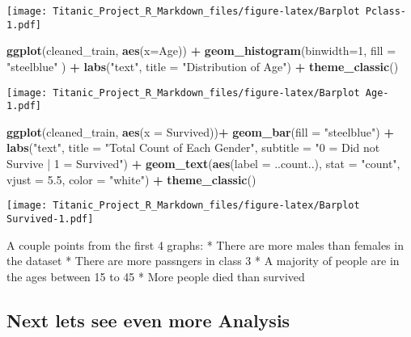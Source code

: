 \documentclass[
]{article}
\newenvironment{Shaded}{\begin{snugshade}}{\end{snugshade}}
\newcommand{\AttributeTok}[1]{\textcolor[rgb]{0.13,0.29,0.53}{#1}}
\newcommand{\DecValTok}[1]{\textcolor[rgb]{0.00,0.00,0.81}{#1}}
\newcommand{\FloatTok}[1]{\textcolor[rgb]{0.00,0.00,0.81}{#1}}
\newcommand{\FunctionTok}[1]{\textcolor[rgb]{0.13,0.29,0.53}{\textbf{#1}}}
\newcommand{\NormalTok}[1]{#1}
\newcommand{\SpecialCharTok}[1]{\textcolor[rgb]{0.81,0.36,0.00}{\textbf{#1}}}
\newcommand{\StringTok}[1]{\textcolor[rgb]{0.31,0.60,0.02}{#1}}
\begin{document}
\texttt{[image: Titanic\_Project\_R\_Markdown\_files/figure-latex/Barplot Pclass-1.pdf]}

\begin{Shaded}
\begin{Highlighting}[]
\FunctionTok{ggplot}\NormalTok{(cleaned\_train, }\FunctionTok{aes}\NormalTok{(}\AttributeTok{x=}\NormalTok{Age)) }\SpecialCharTok{+} 
  \FunctionTok{geom\_histogram}\NormalTok{(}\AttributeTok{binwidth=}\DecValTok{1}\NormalTok{, }\AttributeTok{fill =} \StringTok{"steelblue"}\NormalTok{ ) }\SpecialCharTok{+} 
  \FunctionTok{labs}\NormalTok{(}\StringTok{"text"}\NormalTok{, }\AttributeTok{title =} \StringTok{"Distribution of Age"}\NormalTok{) }\SpecialCharTok{+}
  \FunctionTok{theme\_classic}\NormalTok{()}
\end{Highlighting}
\end{Shaded}

\texttt{[image: Titanic\_Project\_R\_Markdown\_files/figure-latex/Barplot Age-1.pdf]}

\begin{Shaded}
\begin{Highlighting}[]
\FunctionTok{ggplot}\NormalTok{(cleaned\_train, }\FunctionTok{aes}\NormalTok{(}\AttributeTok{x =}\NormalTok{ Survived))}\SpecialCharTok{+} 
  \FunctionTok{geom\_bar}\NormalTok{(}\AttributeTok{fill =} \StringTok{"steelblue"}\NormalTok{) }\SpecialCharTok{+} 
  \FunctionTok{labs}\NormalTok{(}\StringTok{"text"}\NormalTok{, }\AttributeTok{title =} \StringTok{"Total Count of Each Gender"}\NormalTok{, }\AttributeTok{subtitle =} \StringTok{"0 = Did not Survive | 1 = Survived"}\NormalTok{) }\SpecialCharTok{+}
  \FunctionTok{geom\_text}\NormalTok{(}\FunctionTok{aes}\NormalTok{(}\AttributeTok{label =}\NormalTok{ ..count..), }\AttributeTok{stat =} \StringTok{"count"}\NormalTok{, }\AttributeTok{vjust =} \FloatTok{5.5}\NormalTok{, }\AttributeTok{color =} \StringTok{"white"}\NormalTok{) }\SpecialCharTok{+}
  \FunctionTok{theme\_classic}\NormalTok{()}
\end{Highlighting}
\end{Shaded}

\texttt{[image: Titanic\_Project\_R\_Markdown\_files/figure-latex/Barplot Survived-1.pdf]}

A couple points from the first 4 graphs: * There are more males than
females in the dataset * There are more passngers in class 3 * A
majority of people are in the ages between 15 to 45 * More people died
than survived

\hypertarget{next-lets-see-even-more-analysis}{%
\subsection{\texorpdfstring{\textbf{Next lets see even more
Analysis}}{Next lets see even more Analysis}}\label{next-lets-see-even-more-analysis}}
\end{document}

